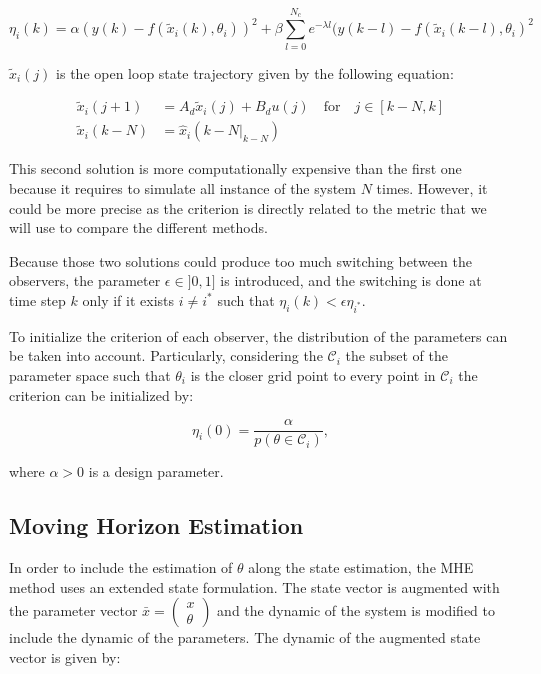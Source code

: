 \begin{equation}
\eta_i(k) = \alpha (y(k) - f(\tilde{x}_i(k), \theta_i))^2 + \beta \sum^{N_c}_{l=0} e^{-\lambda l}(y(k-l) - f(\tilde{x}_i(k-l), \theta_i)^2
\end{equation}

$\tilde{x}_i(j)$ is the open loop state trajectory given by the following equation:

\begin{equation}
\begin{array}{ll}
\tilde{x}_i(j+1) &= A_d \tilde{x}_i(j) + B_d u(j) \quad \text{for} \quad j \in [k-N, k] \\
\tilde{x}_i(k-N) &= \hat{x}_i(k-N|_{k-N})
\end{array}
\end{equation}

This second solution is more computationally expensive than the first one because it requires to simulate all instance of the system $N$ times. However, it could be more precise as the criterion is directly related to the metric that we will use to compare the different methods. \medskip

Because those two solutions could produce too much switching between the observers, the parameter $\epsilon \in ]0,1]$ is introduced, and the switching is done at time step $k$ only if it exists $i\neq i^*$ such that $\eta_i(k)<\epsilon \eta_{i^*}$.
\medskip

To initialize the criterion of each observer, the distribution of the parameters can be taken into account. Particularly, considering the $\mathcal{C}_i$ the subset of the parameter space such that $\theta_i$ is the closer grid point to every point in $\mathcal{C}_i$ the criterion can be initialized by:

\begin{equation}
\eta_i(0) = \frac{\alpha}{p(\theta \in \mathcal{C}_i)},
\end{equation}

where $\alpha >0$ is a design parameter. \medskip

\subsection{Moving Horizon Estimation}

In order to include the estimation of $\theta$ along the state estimation, the MHE method uses an extended state formulation. The state vector is augmented with the parameter vector $\bar{x} = \begin{pmatrix} x \\ \theta \end{pmatrix}$ and the dynamic of the system is modified to include the dynamic of the parameters. The dynamic of the augmented state vector is given by:


